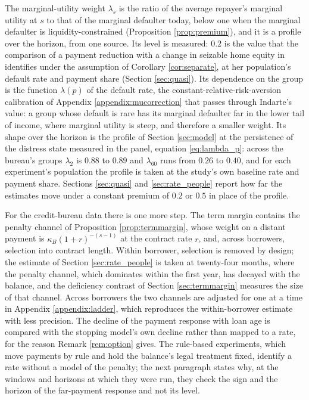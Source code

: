 The marginal-utility weight $\lambda_s$ is the ratio of the average repayer's marginal utility at $s$ to that of the marginal defaulter today, below one when the marginal defaulter is liquidity-constrained (Proposition \ref{prop:premium}), and it is a profile over the horizon, from one source. Its level is measured: $0.2$ is the value that the comparison of a payment reduction with a change in seizable home equity in \citet{indarte_moral_2023} identifies under the assumption of Corollary \ref{cor:separate}, at her population's default rate and payment share (Section \ref{sec:quasi}). Its dependence on the group is the function $\lambda(p)$ of the default rate, the constant-relative-risk-aversion calibration of Appendix \ref{appendix:mucorrection} that passes through Indarte's value: a group whose default is rare has its marginal defaulter far in the lower tail of income, where marginal utility is steep, and therefore a smaller weight. Its shape over the horizon is the profile of Section \ref{sec:model} at the persistence of the distress state measured in the panel, equation \eqref{eq:lambda_p}: across the bureau's groups $\lambda_2$ is $0.88$ to $0.89$ and $\lambda_{60}$ runs from $0.26$ to $0.40$, and for each experiment's population the profile is taken at the study's own baseline rate and payment share. Sections \ref{sec:quasi} and \ref{sec:rate_people} report how far the estimates move under a constant premium of $0.2$ or $0.5$ in place of the profile.

For the credit-bureau data there is one more step. The term margin contains the penalty channel of Proposition \ref{prop:termmargin}, whose weight on a distant payment is $\kappa_B(1+r)^{-(s-1)}$ at the contract rate $r$, and, across borrowers, selection into contract length. Within borrower, selection is removed by design; the estimate of Section \ref{sec:rate_people} is taken at twenty-four months, where the penalty channel, which dominates within the first year, has decayed with the balance, and the deficiency contrast of Section \ref{sec:termmargin} measures the size of that channel. Across borrowers the two channels are adjusted for one at a time in Appendix \ref{appendix:ladder}, which reproduces the within-borrower estimate with less precision. The decline of the payment response with loan age is compared with the stopping model's own decline rather than mapped to a rate, for the reason Remark \ref{rem:option} gives. The rule-based experiments, which move payments by rule and hold the balance's legal treatment fixed, identify a rate without a model of the penalty; the next paragraph states why, at the windows and horizons at which they were run, they check the sign and the horizon of the far-payment response and not its level.

